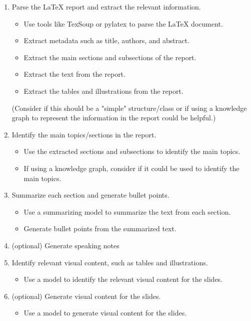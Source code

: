 \begin{enumerate}
\item Parse the \LaTeX{} report and extract the relevant information.
    \begin{itemize}
        \item Use tools like TexSoup or pylatex to parse the \LaTeX{} document.
        \item Extract metadata such as title, authors, and abstract.
        \item Extract the main sections and subsections of the report.
        \item Extract the text from the report.
        \item Extract the tables and illustrations from the report.
    \end{itemize}
    (Consider if this should be a "simple" structure/class or if using a knowledge graph to represent the information in the report could be helpful.)

\item Identify the main topics/sections in the report.
    \begin{itemize}
        \item Use the extracted sections and subsections to identify the main topics.
        \item If using a knowledge graph, consider if it could be used to identify the main topics.
    \end{itemize}

\item Summarize each section and generate bullet points.
    \begin{itemize}
        \item Use a summarizing model to summarize the text from each section.
        \item Generate bullet points from the summarized text.
    \end{itemize}

\item (optional) Generate speaking notes

\item Identify relevant visual content, such as tables and illustrations.
    \begin{itemize}
        \item Use a model to identify the relevant visual content for the slides.
    \end{itemize}
    
\item (optional) Generate visual content for the slides.
    \begin{itemize}
        \item Use a model to generate visual content for the slides.
    \end{itemize}


\end{enumerate}
